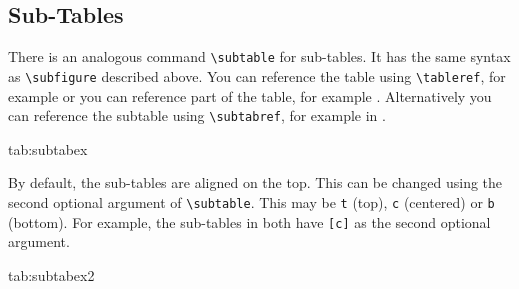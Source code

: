 \documentclass[mlabstract]{jmlr}
\begin{document}
\subsection{Sub-Tables}
\label{sec:subtables}
There is an analogous command \verb|\subtable| for sub-tables.
It has the same syntax as \verb|\subfigure| described above.
You can reference the table using \verb|\tableref|, for example
 or you can reference part of the table,
for example . Alternatively you can reference the
subtable using \verb|\subtabref|, for example
 in .

\begin{table}[htbp]
\floatconts
 {tab:subtabex}
 {\caption{An Example With Sub-Tables}}
 {%
   \qquad
 }
\end{table}

By default, the sub-tables are aligned on the top.
This can be changed using the second optional argument
of \verb|\subtable|. This may be \texttt{t} (top), \texttt{c}
(centered) or \texttt{b} (bottom). For example, the sub-tables
 in 
both have \verb|[c]| as the second optional argument.

\begin{table}[htbp]
\floatconts
 {tab:subtabex2}
 {\caption{Another Example With Sub-Tables}}
 {%
   \qquad
 }
\end{table}
\end{document}
